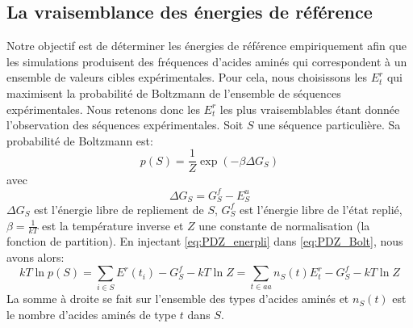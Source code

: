 \subsection{La vraisemblance des énergies de référence}

Notre objectif est de  déterminer les énergies de référence empiriquement afin que les simulations produisent des fréquences d'acides aminés qui correspondent à un ensemble de valeurs cibles expérimentales. Pour cela, nous choisissons les $E_t^r$ qui maximisent la probabilité de Boltzmann de l'ensemble de séquences expérimentales. Nous retenons donc les $E_t^r$ les plus vraisemblables étant donnée l'observation des séquences expérimentales. Soit $S$ une séquence particulière. Sa probabilité de Boltzmann est:
\begin{equation}
  \label{eq:PDZ_Bolt}
  p(S)=\frac{1}{Z}\exp(-\beta \Delta G_S)
\end{equation}
avec
\begin{equation}
  \label{eq:PDZ_enerpli}
  \Delta G_S=G_S^f - E^u_S
\end{equation}
$\Delta G_S$ est l'énergie libre de repliement de $S$, $G^f_S$ est l'énergie libre de l'état replié, $\beta =\frac{1}{kT}$ est la température inverse et $Z$ une constante de normalisation (la fonction de partition). En injectant \ref{eq:PDZ_enerpli} dans \ref{eq:PDZ_Bolt}, nous avons alors:
\begin{equation}
kT \ln p(S) = \sum_{i\in S} E^r(t_i) - G^f_S - kT \ln Z = \sum_{t\in aa}n_S(t)E^r_t - G^f_S - kT\ln Z
\end{equation}
La somme à droite se fait sur l'ensemble des types d'acides aminés et $n_S(t)$ est le nombre d'acides aminés de type $t$ dans $S$.

